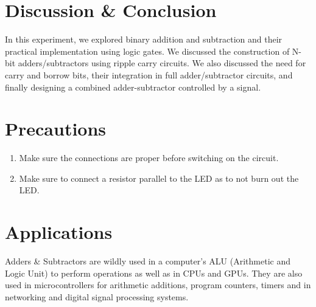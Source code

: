 \section{Discussion \& Conclusion}

In this experiment, we explored binary addition and subtraction and their practical implementation using logic gates. We discussed the construction of N-bit adders/subtractors using ripple carry circuits. We also discussed the need for carry and borrow bits, their integration in full adder/subtractor circuits, and finally designing a combined adder-subtractor controlled by a signal.

\section{Precautions}

\begin{enumerate}
    \item Make sure the connections are proper before switching on the circuit.
    \item Make sure to connect a resistor parallel to the LED as to not burn out the LED.
\end{enumerate}

\section{Applications}
Adders \& Subtractors are wildly used in a computer's ALU (Arithmetic and Logic Unit) to perform operations as well as in CPUs and GPUs.
They are also used in microcontrollers for arithmetic additions, program counters, timers and in networking and digital signal processing systems.